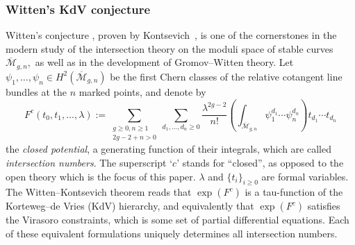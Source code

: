 \documentclass[11pt]{amsart}
\theoremstyle{definition}
\theoremstyle{remark}
\newcommand{\<}{\left<}
\renewcommand{\>}{\right>}
\numberwithin{equation}{section}
\def\Mbar{{\overline{\mathcal M}}}
\begin{document}
\subsubsection{Witten's KdV conjecture}
Witten's %
conjecture \cite{Witten2DGravity}, proven by Kontsevich~\cite{Kontsevich}, is one of the cornerstones in the modern study of the intersection theory on the moduli space of %
stable curves~$\Mbar_{g,n},$ %
as well as in the development of Gromov--Witten theory. Let $\psi_1, \ldots, \psi_n \in H^2(\Mbar_{g,n})$ be the first Chern classes of the relative cotangent line bundles at the $n$ marked points, and denote by
\[
F^c(t_0,t_1,\ldots,\lambda) := \sum_{\substack{g \geq 0, n\geq 1\\2g-2+n>0}} \sum_{d_1,\ldots,d_n\geq 0} \frac{\lambda^{2g-2}}{n!}\left(\int_{\Mbar_{g,n}} \psi_1^{d_1} \cdots \psi_n^{d_n} \right)t_{d_1} \cdots t_{d_n}
\]
the \emph{closed potential}, a generating function of their integrals, which are called \emph{intersection numbers}. The superscript `$c$' stands %
for ``closed'', as %
opposed to the open theory which is the focus of this paper.  $\lambda$ and $\{t_i\}_{i\ge 0}$  are formal variables.  The Witten--Kontsevich theorem reads that $\exp(F^c)$ is a tau-function of the Korteweg--de Vries (KdV) %
hierarchy, and equivalently that %
$\exp(F^c)$ satisfies the Virasoro constraints, which is some set of partial differential equations. Each of these equivalent formulations uniquely determines all intersection numbers.
\end{document}
